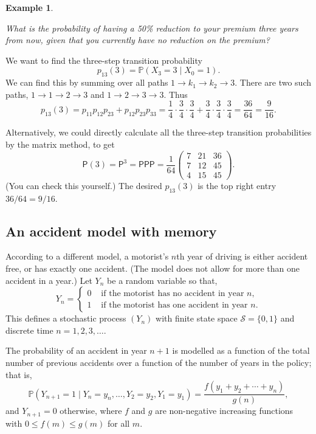 \documentclass[
  a4paper,
]{article}
\theoremstyle{definition}
\theoremstyle{definition}
\newtheorem{example}{Example}[section]
\theoremstyle{definition}
\theoremstyle{remark}
\begin{document}
\begin{example}
\protect\hypertarget{exm:act1}{}\label{exm:act1}

\emph{What is the probability of having a 50\% reduction to your premium three years from now, given that you currently have no reduction on the premium?}

We want to find the three-step transition probability
\[
p_{13}(3) = \mathbb P(X_{3} = 3 \mid X_0=1) .
\]
We can find this by summing over all paths \(1 \to k_1 \to k_2 \to 3\). There are two such paths, \(1 \to 1 \to 2 \to 3\) and \(1 \to 2 \to 3 \to 3\). Thus
\[ p_{13}(3) = p_{11}p_{12}p_{23} + p_{12}p_{23}p_{33} = \frac14 \cdot\frac34 \cdot\frac34 + \frac34 \cdot\frac34 \cdot\frac34 = \frac{36}{64} = \frac{9}{16} . \]

Alternatively, we could directly calculate all the three-step transition probabilities by the matrix method, to get
\[ \mathsf P(3) = \mathsf P^3 = \mathsf{PPP} = \frac{1}{64} \begin{pmatrix} 7 & 21 & 36 \\ 7 & 12 & 45 \\ 4 & 15 & 45 \end{pmatrix} .\]
(You can check this yourself.) The desired \(p_{13}(3)\) is the top right entry \(36/64 = 9/16\).

\end{example}

\hypertarget{S06-example2}{%
\subsection{An accident model with memory}\label{S06-example2}}

According to a different model, a motorist's \(n\)th year of driving is either accident free, or has exactly one accident. (The model does not allow for more than one accident in a year.) Let \(Y_n\) be a random variable so that,
\[
Y_n=\begin{cases}
0&\text{ if the motorist has no accident in year $n$,}\\
1&\text{ if the motorist has one accident in year $n$.}
\end{cases}
\]
This defines a stochastic process \((Y_n)\) with finite state space \(\mathcal{S}=\{0,1\}\) and discrete time \(n = 1,2,3,\dots\).

The probability of an accident in year \(n+1\) is modelled as a function of the total number of previous accidents over a function of the number of years in the policy; that is,
\[
\mathbb P(Y_{n+1}= 1 \mid Y_n=y_{n},\dots ,Y_2=y_{2},Y_1=y_{1} )=\frac{f(y_1+y_2+\cdots +y_n)}{g(n)},
\]
and \(Y_{n+1} = 0\) otherwise,
where \(f\) and \(g\) are non-negative increasing functions with \(0\leq f(m)\leq g(m)\) for all \(m\).
\end{document}
